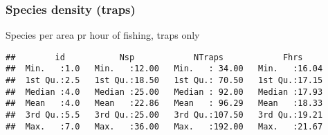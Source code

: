 \documentclass[]{article}
\newenvironment{Shaded}{\begin{snugshade}}{\end{snugshade}}
\newcommand{\KeywordTok}[1]{\textcolor[rgb]{0.13,0.29,0.53}{\textbf{#1}}}
\newcommand{\StringTok}[1]{\textcolor[rgb]{0.31,0.60,0.02}{#1}}
\newcommand{\OperatorTok}[1]{\textcolor[rgb]{0.81,0.36,0.00}{\textbf{#1}}}
\newcommand{\NormalTok}[1]{#1}
\begin{document}
\subsubsection{Species density (traps)}\label{species-density-traps}

Species per area pr hour of fishing, traps only

\begin{Shaded}
\end{Shaded}

\begin{verbatim}
##        id           Nsp            NTraps            Fhrs      
##  Min.   :1.0   Min.   :12.00   Min.   : 34.00   Min.   :16.04  
##  1st Qu.:2.5   1st Qu.:18.50   1st Qu.: 70.50   1st Qu.:17.15  
##  Median :4.0   Median :25.00   Median : 92.00   Median :17.93  
##  Mean   :4.0   Mean   :22.86   Mean   : 96.29   Mean   :18.33  
##  3rd Qu.:5.5   3rd Qu.:25.00   3rd Qu.:107.50   3rd Qu.:19.21  
##  Max.   :7.0   Max.   :36.00   Max.   :192.00   Max.   :21.67
\end{verbatim}
\end{document}
